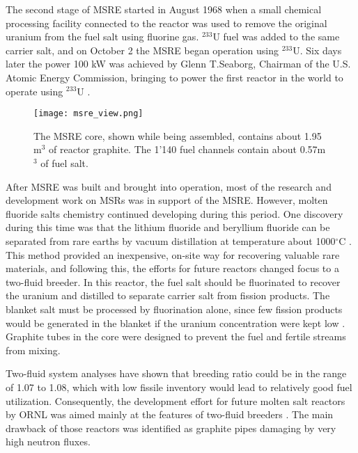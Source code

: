 The second stage of \gls{MSRE} started in August 1968 when a small chemical processing facility connected to the reactor was used to remove the original uranium from the fuel salt using fluorine gas. $^{233}$U fuel was added to the same carrier salt, and on October 2 the \gls{MSRE} began operation using $^{233}$U. Six days later the power 100 kW was achieved by Glenn T.Seaborg, Chairman of the U.S. Atomic Energy Commission, bringing to power the first reactor in the world to operate using $^{233}$U \cite{haubenreich_experience_1970}.

\begin{figure}[htp!] %
  \centering
  \vspace{-0.3em}
  \texttt{[image: msre\_view.png]}
  \caption{The \gls{MSRE} core, shown while being assembled, contains about 1.95 m$^3$ of reactor graphite. The 1'140 fuel channels contain about 0.57m$^3$ of fuel salt.}
  \vspace{-0.6em}
  \label{fig:msre}
\end{figure}
\FloatBarrier

After \gls{MSRE} was built and brought into operation, most of the research and development work on \glspl{MSR} was in support of the \gls{MSRE}. However, molten fluoride salts chemistry continued developing during this period. One discovery during this time was that the lithium fluoride and beryllium fluoride can be separated from rare earths by vacuum distillation at temperature about 1000$^{\circ}$C \cite{kelly_removal_1965}. This method provided an inexpensive, on-site way for recovering valuable rare materials, and following this, the efforts for future reactors changed focus to a two-fluid breeder. In this reactor, the fuel salt should be fluorinated to recover the uranium and distilled to separate carrier salt from fission products. The blanket salt must be processed by fluorination alone, since few fission products would be generated in the blanket if the uranium concentration were kept low \cite{rosenthal_molten-salt_1970}. Graphite tubes in the core were designed to prevent the fuel and fertile streams from mixing.

Two-fluid system analyses have shown that breeding ratio could be in the range of 1.07 to 1.08, which with low fissile inventory would lead to relatively good fuel utilization. Consequently, the development effort for future molten salt reactors by \gls{ORNL} was aimed mainly at the features of two-fluid breeders \cite{briggs_summary_1967}. The main drawback of those reactors was identified as graphite pipes damaging by very high neutron fluxes.

